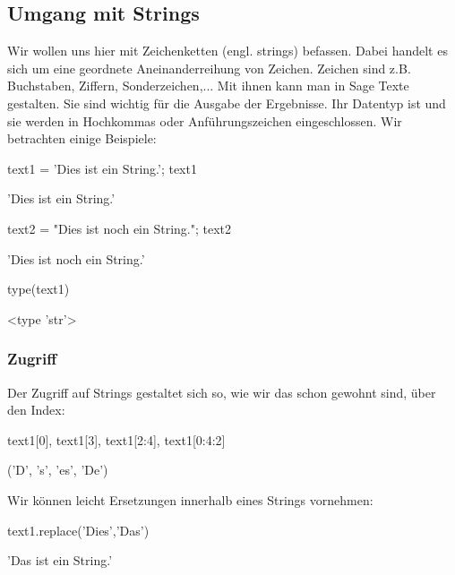 \documentclass[fontsize=12pt,paper=a4,twoside,bibtotoc,idxtotoc,
liststotoc,pagesize,BCOR1.2cm,DIV15,chapterprefix,pagesize=pdftex]{scrbook}
\theoremstyle{plain}
\theoremstyle{definition}
\theoremstyle{remark}
\begin{document}
\subsection{Umgang mit Strings}
Wir wollen uns hier mit Zeichenketten (engl. strings) befassen. Dabei handelt es sich um eine geordnete
Aneinanderreihung von Zeichen. Zeichen sind z.B. Buchstaben, Ziffern,
Sonderzeichen,... Mit ihnen kann man in Sage Texte gestalten. Sie sind wichtig
für die Ausgabe der Ergebnisse. Ihr Datentyp ist  und sie werden in Hochkommas oder Anführungszeichen 
eingeschlossen. Wir betrachten einige Beispiele:
\begin{sagein}
text1 = 'Dies ist ein String.'; text1
\end{sagein}
\begin{sageout}
'Dies ist ein String.'
\end{sageout}
\begin{sagein}
text2 = "Dies ist noch ein String."; text2
\end{sagein}
\begin{sageout}
'Dies ist noch ein String.'
\end{sageout}
\begin{sagein}
type(text1)
\end{sagein}
\begin{sageout}
<type 'str'>
\end{sageout}
\subsubsection{Zugriff}
Der Zugriff auf Strings gestaltet sich so, wie wir das schon gewohnt sind, über den Index:
\begin{sagein}
text1[0], text1[3], text1[2:4], text1[0:4:2]
\end{sagein}
\begin{sageout}
('D', 's', 'es', 'De')
\end{sageout}
Wir können leicht Ersetzungen innerhalb eines Strings vornehmen:
\begin{sagein}
text1.replace('Dies','Das')
\end{sagein}
\begin{sageout}
'Das ist ein String.'
\end{sageout}
\end{document}
